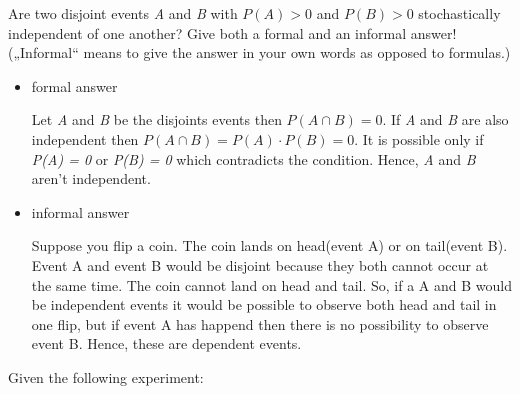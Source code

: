 \documentclass{homework}
\begin{document}
\exercise*
Are two disjoint events \emph{A} and \emph{B} with $P(A) > 0$ and $P(B) > 0$ stochastically independent of one another? Give both a formal and an informal answer! („Informal“ means to give the answer in your own words as opposed to formulas.)
\begin{itemize}
\item formal answer

Let \emph{A} and \emph{B} be the disjoints events then $P(A\cap B) = 0$. If \emph{A} and \emph{B} are also independent then $P(A\cap B) = P(A)\cdot P(B) = 0$. It is possible only if \emph{P(A) = 0} or \emph{P(B) = 0} which contradicts the condition. Hence, \emph{A} and \emph{B} aren't independent.

\item informal answer

Suppose you flip a coin. The coin lands on head(event A) or on tail(event B). Event A and event B would be disjoint because they both cannot occur at the same time. The coin cannot land on head and tail. So, if a A and B would be independent events it would be possible to observe both head and tail in one flip, but if event A has happend then there is no possibility to observe event B. Hence, these are dependent events.
\end{itemize}

\exercise*
Given the following experiment:
\end{document}

